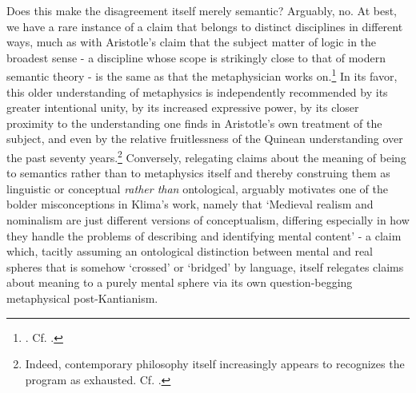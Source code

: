\documentclass[]{article}
\begin{document}
Does this make the disagreement itself merely semantic? 
Arguably, no. 
At best, we have a rare instance of a claim that belongs to distinct disciplines in different ways, 
much as with Aristotle's claim that the subject matter of logic in the broadest sense - 
a discipline whose scope is strikingly close to that of modern semantic theory - 
is the same as that the metaphysician works on.\footnote{\autocite[1004b 22-23]{Metaph}. Cf. \autocite[q. 3]{ScotusIsagoge}.}
In its favor, 
this older understanding of metaphysics is independently recommended 
by its greater intentional unity, 
by its increased expressive power, 
by its closer proximity to the understanding one finds in Aristotle's own treatment of the subject, 
and even by the relative fruitlessness of the Quinean understanding over the past seventy years.\footnote{
Indeed, contemporary philosophy itself increasingly appears to recognizes the program as exhausted. Cf. \autocite{Schaffer2009,Schaffer2016}.}
Conversely, 
relegating claims about the meaning of being to semantics 
rather than to metaphysics itself 
and thereby construing them as linguistic or conceptual \emph{rather than} ontological, 
arguably motivates one of the bolder misconceptions in Klima's work, 
namely that 
`Medieval realism and nominalism are just different versions of conceptualism, differing especially in how they handle the problems of 
describing and identifying mental content' \autocite[110]{Klima2011} 
- a claim which, 
tacitly assuming an ontological distinction between mental and real spheres that is somehow `crossed' or `bridged' by language, 
itself relegates claims about meaning to a purely mental sphere via its own question-begging metaphysical post-Kantianism.

\printbibliography
\end{document}
